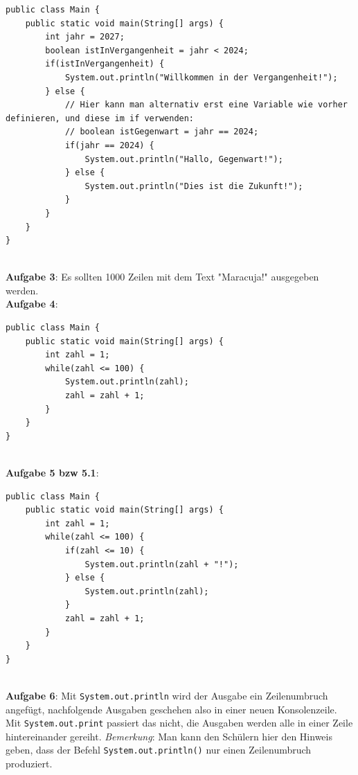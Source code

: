 \documentclass[ngerman,11pt]{article}
\begin{document}
    \begin{lstlisting}
public class Main {
    public static void main(String[] args) {
        int jahr = 2027;
        boolean istInVergangenheit = jahr < 2024;
        if(istInVergangenheit) {
            System.out.println("Willkommen in der Vergangenheit!");
        } else {
            // Hier kann man alternativ erst eine Variable wie vorher definieren, und diese im if verwenden:
            // boolean istGegenwart = jahr == 2024;
            if(jahr == 2024) {
                System.out.println("Hallo, Gegenwart!");
            } else {
                System.out.println("Dies ist die Zukunft!");
            }
        }
    }
}
    \end{lstlisting} \\

    \textbf{Aufgabe 3}: Es sollten 1000 Zeilen mit dem Text "Maracuja!" ausgegeben werden. \\

    \textbf{Aufgabe 4}:

    \begin{lstlisting}
public class Main {
    public static void main(String[] args) {
        int zahl = 1;
        while(zahl <= 100) {
            System.out.println(zahl);
            zahl = zahl + 1;
        }
    }
}
    \end{lstlisting} \\

    \textbf{Aufgabe 5 bzw 5.1}:

    \begin{lstlisting}
public class Main {
    public static void main(String[] args) {
        int zahl = 1;
        while(zahl <= 100) {
            if(zahl <= 10) {
                System.out.println(zahl + "!");
            } else {
                System.out.println(zahl);
            }
            zahl = zahl + 1;
        }
    }
}
    \end{lstlisting} \\

    \textbf{Aufgabe 6}: Mit \lstinline{System.out.println} wird der Ausgabe ein Zeilenumbruch angefügt, nachfolgende Ausgaben
    geschehen also in einer neuen Konsolenzeile.
    Mit \lstinline{System.out.print} passiert das nicht, die Ausgaben werden alle in einer Zeile hintereinander gereiht.
    \textit{Bemerkung}: Man kann den Schülern hier den Hinweis geben, dass der Befehl \lstinline{System.out.println()} nur einen Zeilenumbruch produziert. \\
\end{document}
